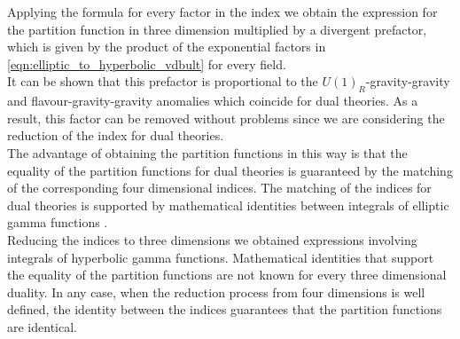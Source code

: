 Applying the formula for every factor in the index we obtain the expression for the partition function in three dimension multiplied by a divergent prefactor, which is given by the product of the exponential factors in \eqref{eqn:elliptic_to_hyperbolic_vdbult} for every field.\\
It can be shown \cite{Aharony:2013dha} that this prefactor is proportional to the $U(1)_R$-gravity-gravity and flavour-gravity-gravity anomalies which coincide for dual theories.
As a result, this factor can be removed without problems since we are considering the reduction of the index for dual theories.\\
The advantage of obtaining the partition functions in this way is that the equality of the partition functions for dual theories is guaranteed by the matching of the corresponding four dimensional indices.
The matching of the indices for dual theories is supported by mathematical identities  between integrals of elliptic gamma functions \cite{rains309252transformations}.
\\
Reducing the indices to three dimensions we obtained expressions involving integrals of hyperbolic gamma functions. 
Mathematical identities that support the equality of the partition functions \cite{vanDeBult:2007} are not known for every three dimensional duality.
In any case, when the reduction process from four dimensions is well defined, the identity between the indices guarantees that the partition functions are identical.







